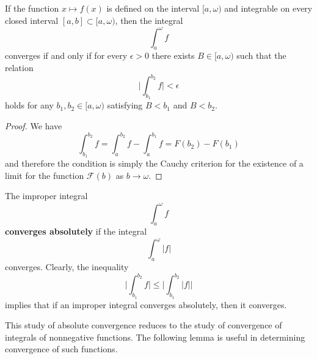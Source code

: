   \begin{theorem}
    \label{thm:cauchy-criterion-for-convergence-of-an-improper}
    If the function $x \mapsto f(x)$ is defined on the interval $[a, \omega)$ and integrable on every closed interval $[a, b] \subset [a, \omega)$, then the integral 
    \begin{equation}
      \int_a^\omega f
    \end{equation}
    converges if and only if for every $\epsilon > 0$ there exists $B \in [a, \omega)$ such that the relation
    \begin{equation}
      \Bigg| \int_{b_1}^{b_2} f \bigg| < \epsilon
    \end{equation}
    holds for any $b_1, b_2 \in [a, \omega)$ satisfying $B < b_1$ and $B < b_2$. 
  \end{theorem}
  \begin{proof}
    We have
    \begin{equation}
      \int_{b_1}^{b_2} f = \int_a^{b_2} f - \int_a^{b_1} f = F(b_2) - F(b_1)
    \end{equation}
    and therefore the condition is simply the Cauchy criterion for the existence of a limit for the function $\mathcal{F}(b)$ as $b \rightarrow \omega$. 
  \end{proof}

  \begin{definition}
    \label{def:absolute-convergence-of-an-improper-integral}
    The improper integral 
    \begin{equation}
      \int_a^\omega f
    \end{equation}
    \textbf{converges absolutely} if the integral
    \begin{equation}
      \int_a^\omega |f|
    \end{equation}
    converges. Clearly, the inequality
    \begin{equation}
      \Bigg| \int_{b_1}^{b_2} f \Bigg| \leq \Bigg| \int_{b_1}^{b_2} |f| \Bigg|
    \end{equation}
    implies that if an improper integral converges absolutely, then it converges. 
  \end{definition}

  This study of absolute convergence reduces to the study of convergence of integrals of nonnegative functions. The following lemma is useful in determining convergence of such functions. 

